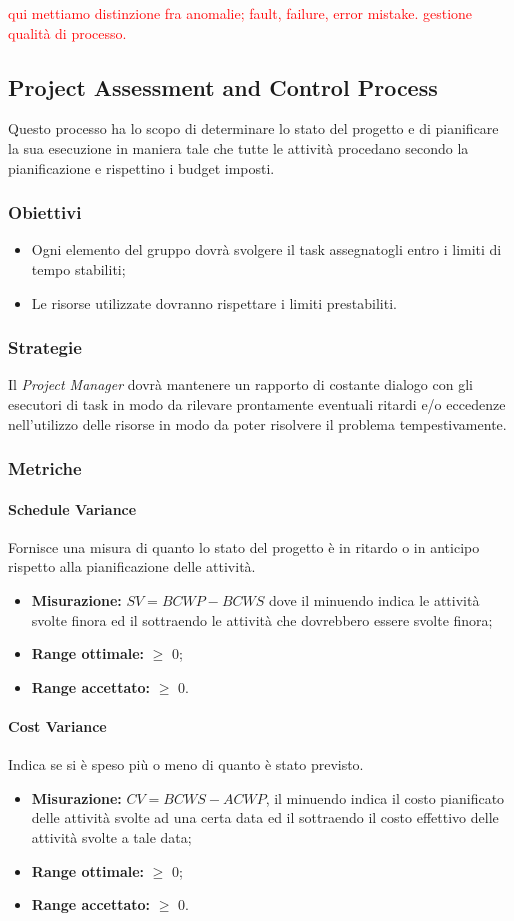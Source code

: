 	\textcolor{red}{qui mettiamo distinzione fra anomalie; fault, failure, error mistake.}
	\textcolor{red}{gestione qualità di processo.}
	\subsection{Project Assessment and Control Process}
		Questo processo ha lo scopo di determinare lo stato del progetto e di pianificare la sua esecuzione in maniera tale che tutte le attività procedano secondo la pianificazione e rispettino i budget imposti.
		\subsubsection{Obiettivi}
			\begin{itemize}
				\item Ogni elemento del gruppo dovrà svolgere il task assegnatogli entro i limiti di tempo stabiliti;
				\item Le risorse utilizzate dovranno rispettare i limiti prestabiliti.
			\end{itemize}
	\subsubsection{Strategie}
	Il \emph{Project Manager} dovrà mantenere un rapporto di costante dialogo con gli esecutori di task in modo da rilevare prontamente eventuali ritardi e/o eccedenze nell'utilizzo delle risorse in modo da poter risolvere il problema tempestivamente.
	\subsubsection{Metriche}
		\paragraph{Schedule Variance} \Spazio
		Fornisce una misura di quanto lo stato del progetto è in ritardo o in anticipo rispetto alla pianificazione delle attività.
		\begin{itemize}
			\item  \textbf{Misurazione: }$SV = BCWP - BCWS$ dove il minuendo indica le attività svolte finora ed il sottraendo le attività che dovrebbero essere svolte finora;
			\item \textbf{Range ottimale: }$\geq$ 0;
			\item \textbf{Range accettato: }$\geq$ 0.
		\end{itemize}
		\paragraph{Cost Variance} \Spazio
		Indica se si è speso più o meno di quanto è stato previsto.
		\begin{itemize}
			\item \textbf{Misurazione: }$CV = BCWS - ACWP$, il minuendo indica il costo pianificato delle attività svolte ad una certa data ed il sottraendo il costo effettivo delle attività svolte a tale data;
			\item \textbf{Range ottimale: }$\geq$ 0;
			\item \textbf{Range accettato: }$\geq$ 0.
		\end{itemize}

